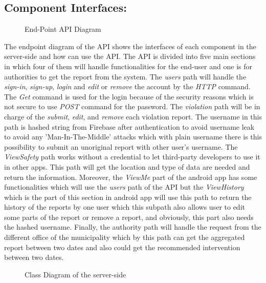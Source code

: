 \subsection{Component Interfaces:}

\begin{sidewaysfigure}
\begin{figure}[H]
\caption{End-Point API Diagram}
\label{fig:endpoint-api}
\centering

\end{figure}
\end{sidewaysfigure}

The endpoint diagram of the API shows the interfaces of each component in the server-side and how can use the API. The API is divided into five main sections in which four of them will handle functionalities for the end-user and one is for authorities to get the report from the system. The \emph{users} path will handle the \emph{sign-in}, \emph{sign-up}, \emph{login} and \emph{edit} or \emph{remove} the account by the \emph{HTTP} command. The \emph{Get} command is used for the login because of the security reasons which is not secure to use \emph{POST} command for the password. The \emph{violation} path will be in charge of the \emph{submit}, \emph{edit}, and \emph{remove} each violation report. The username in this path is hashed string from Firebase after authentication to avoid username leak to avoid any 'Man-In-The-Middle' attacks which with plain username there is this possibility to submit an unoriginal report with other user's username. The \emph{ViewSafety} path works without a credential to let third-party developers to use it in other apps. This path will get the location and type of data are needed and return the information. Moreover, the \emph{ViewMe} part of the android app has some functionalities which will use the \emph{users} path of the API but the \emph{ViewHistory} which is the part of this section in android app will use this path to return the history of the reports by one user which this subpath also allows user to edit some parts of the report or remove a report, and obviously, this part also needs the hashed username. Finally, the authority path will handle the request from the different office of the municipality which by this path can get the aggregated report between two dates and also could get the recommended intervention between two dates.

\clearpage
\begin{sidewaysfigure}
\begin{figure}[H]
\caption{Class Diagram of the server-side}
\label{fig:Class-server}
\centering

\end{figure}
\end{sidewaysfigure}


